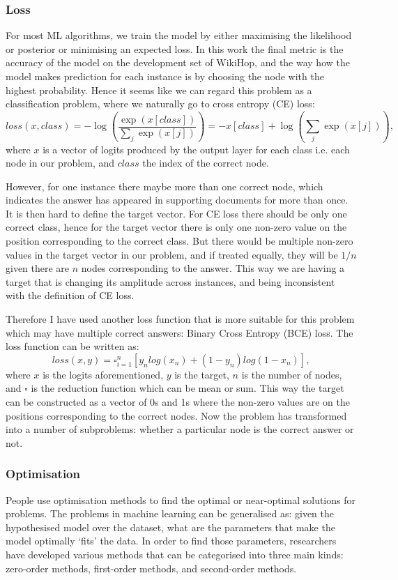 \documentclass[12pt]{report}
\begin{document}
\subsubsection{Loss}
For most ML algorithms, we train the model by either maximising the likelihood or posterior or minimising an expected loss. In this work the final metric is the accuracy of the model on the development set of WikiHop, and the way how the model makes prediction for each instance is by choosing the node with the highest probability. Hence it seems like we can regard this problem as a classification problem, where we naturally go to cross entropy (CE) loss:
\[loss(x, class) = -\log\left(\frac{\exp(x[class])}{\sum_j \exp(x[j])}\right) = -x[class] + \log\left(\sum_j \exp(x[j])\right), \]
where $x$ is a vector of logits produced by the output layer for each class i.e. each node in our problem, and $class$ the index of the correct node.

However, for one instance there maybe more than one correct node, which indicates the answer has appeared in supporting documents for more than once. It is then hard to define the target vector. For CE loss there should be only one correct class, hence for the target vector there is only one non-zero value on the position corresponding to the correct class. But there would be multiple non-zero values in the target vector in our problem, and if treated equally, they will be $1/n$ given there are $n$ nodes corresponding to the answer. This way we are having a target that is changing its amplitude across instances, and being inconsistent with the definition of CE loss.

Therefore I have used another loss function that is more suitable for this problem which may have multiple correct answers: Binary Cross Entropy (BCE) loss. The loss function can be written as:
\[loss(x, y) = \square_{i=1}^n [y_nlog(x_n)+(1-y_n)log(1-x_n)],\]
where $x$ is the logits aforementioned, $y$ is the target, $n$ is the number of nodes, and $\square$ is the reduction function which can be mean or sum. This way the target can be constructed as a vector of 0s and 1s where the non-zero values are on the positions corresponding to the correct nodes. Now the problem has transformed into a number of subproblems: whether a particular node is the correct answer or not.

\subsubsection{Optimisation}
People use optimisation methods to find the optimal or near-optimal solutions for problems. The problems in machine learning can be generalised as: given the hypothesised model over the dataset, what are the parameters that make the model optimally `fits' the data. In order to find those parameters, researchers have developed various methods that can be categorised into three main kinds: zero-order methods, first-order methods, and second-order methods.
\end{document}
